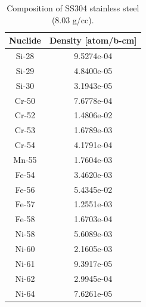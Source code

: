\begin{appendices}
\begin{table}[h!]
  \centering
  \caption[BEAVRS isotopic composition for stainless steel]{Composition of SS304 stainless steel (8.03 g/cc).}
  \footnotesize
  \label{table:chap7-beavrs-isotopes-3.1-stainless-steel}
  \vspace{6pt}
  \begin{tabular}{c c}
  \toprule
  \rowcolor{lightgray}
  {\bf Nuclide} &
  {\bf Density [atom/b-cm]} \\
  \midrule
  Si-28 & 9.5274e-04 \\
  Si-29 & 4.8400e-05 \\
  Si-30 & 3.1943e-05 \\
  Cr-50 & 7.6778e-04 \\
  Cr-52 & 1.4806e-02 \\
  Cr-53 & 1.6789e-03 \\
  Cr-54 & 4.1791e-04 \\
  Mn-55 & 1.7604e-03 \\
  Fe-54 & 3.4620e-03 \\
  Fe-56 & 5.4345e-02 \\
  Fe-57 & 1.2551e-03 \\
  Fe-58 & 1.6703e-04 \\
  Ni-58 & 5.6089e-03 \\
  Ni-60 & 2.1605e-03 \\
  Ni-61 & 9.3917e-05 \\
  Ni-62 & 2.9945e-04 \\
  Ni-64 & 7.6261e-05 \\
  \bottomrule
\end{tabular}
\end{table}


\end{appendices}
